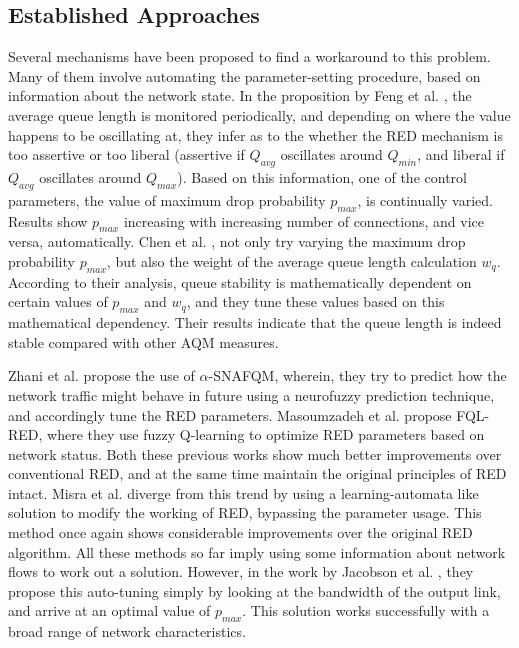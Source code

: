 \documentclass[conference, 10pt]{IEEEtran}
\begin{document}
\subsection{Established Approaches}
\label{sec:intro:currentapp}
Several mechanisms have been proposed to find a workaround to this problem. Many of them involve automating the parameter-setting procedure, based on information about the network state. In the proposition by Feng et al. \cite{feng1999self}, the average queue length is monitored periodically, and depending on where the value happens to be oscillating at, they infer as to the whether the RED mechanism is too assertive or too liberal (assertive if $Q_{avg}$ oscillates around $Q_{min}$, and liberal if $Q_{avg}$ oscillates around $Q_{max}$). Based on this information, one of the control parameters, the value of maximum drop probability $p_{max}$, is continually varied. Results show $p_{max}$ increasing with increasing number of connections, and vice versa, automatically. Chen et al. \cite{chen2011self}, not only try varying the maximum drop probability $p_{max}$, but also the weight of the average queue length calculation $w_q$. According to their analysis, queue stability is mathematically dependent on certain values of $p_{max}$ and $w_q$, and they tune these values based on this mathematical dependency. Their results indicate that the queue length is indeed stable compared with other AQM measures. 

Zhani et al. \cite{zhani2007alpha_} propose the use of $\alpha$-SNAFQM, wherein, they try to predict how the network traffic might behave in future using a neurofuzzy prediction technique, and accordingly tune the RED parameters. Masoumzadeh et al. \cite{masoumzadeh2011fql} propose FQL-RED, where they use fuzzy Q-learning to optimize RED parameters based on network status. Both these previous works show much better improvements over conventional RED, and at the same time maintain the original principles of RED intact. Misra et al. \cite{misra2010random} diverge from this trend by using a learning-automata like solution to modify the working of RED, bypassing the parameter usage. This method once again shows considerable improvements over the original RED algorithm. All these methods so far imply using some information about network flows to work out a solution. However, in the work by Jacobson et al. \cite{jacobson1999red}, they propose this auto-tuning simply by looking at the bandwidth of the output link, and arrive at an optimal value of $p_{max}$. This solution works successfully with a broad range of network characteristics.   
\end{document}
